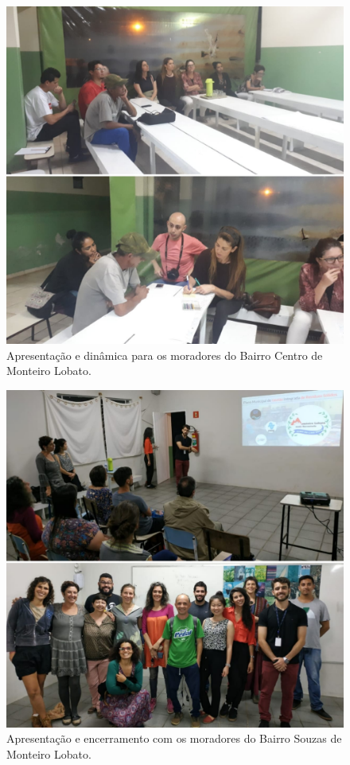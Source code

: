 \begin{figure}
\centering
\includegraphics[width=0.75\linewidth]{produtos/prodtres/image104}
\caption{Apresentação e dinâmica para os moradores do Bairro Centro de Monteiro Lobato.}
\label{fig:image104}
\end{figure}

\begin{figure}
\centering
\includegraphics[width=0.75\linewidth]{produtos/prodtres/image105}
\caption{Apresentação e encerramento com os moradores do Bairro Souzas de Monteiro Lobato.}
\label{fig:image105}
\end{figure}

